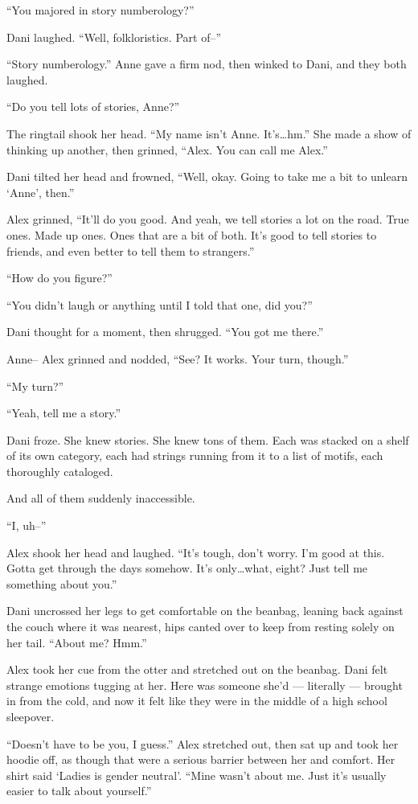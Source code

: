``You majored in story numberology?''

Dani laughed. ``Well, folkloristics. Part of--''

``Story numberology.'' Anne gave a firm nod, then winked to Dani, and they both laughed.

``Do you tell lots of stories, Anne?''

The ringtail shook her head. ``My name isn't Anne. It's\ldots{}hm.'' She made a show of thinking up another, then grinned, ``Alex. You can call me Alex.''

Dani tilted her head and frowned, ``Well, okay. Going to take me a bit to unlearn `Anne', then.''

Alex grinned, ``It'll do you good. And yeah, we tell stories a lot on the road. True ones. Made up ones. Ones that are a bit of both. It's good to tell stories to friends, and even better to tell them to strangers.''

``How do you figure?''

``You didn't laugh or anything until I told that one, did you?''

Dani thought for a moment, then shrugged. ``You got me there.''

Anne-- Alex grinned and nodded, ``See? It works. Your turn, though.''

``My turn?''

``Yeah, tell me a story.''

Dani froze. She knew stories. She knew tons of them. Each was stacked on a shelf of its own category, each had strings running from it to a list of motifs, each thoroughly cataloged.

And all of them suddenly inaccessible.

``I, uh--''

Alex shook her head and laughed. ``It's tough, don't worry. I'm good at this. Gotta get through the days somehow. It's only\ldots{}what, eight? Just tell me something about you.''

Dani uncrossed her legs to get comfortable on the beanbag, leaning back against the couch where it was nearest, hips canted over to keep from resting solely on her tail. ``About me? Hmm.''

Alex took her cue from the otter and stretched out on the beanbag. Dani felt strange emotions tugging at her. Here was someone she'd --- literally --- brought in from the cold, and now it felt like they were in the middle of a high school sleepover.

``Doesn't have to be you, I guess.'' Alex stretched out, then sat up and took her hoodie off, as though that were a serious barrier between her and comfort. Her shirt said `Ladies is gender neutral'. ``Mine wasn't about me. Just it's usually easier to talk about yourself.''

